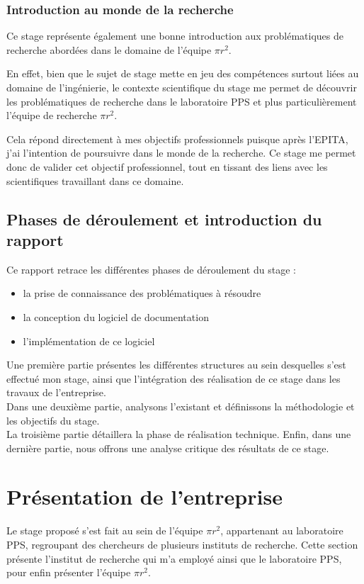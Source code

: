 \documentclass[a4paper, 11pt]{report}
\newcommand{\pir}[0]{\textbf{$\pi r^2$}\xspace}
\newcommand{\epita}[0]{EPITA}
\begin{document}
  \subsection{Introduction au monde de la recherche}
  Ce stage représente également une bonne introduction aux problématiques
  de recherche abordées dans le domaine de l'équipe \pir.

  En effet, bien que le sujet de stage mette en jeu des compétences surtout
  liées au domaine de l'ingénierie, le contexte scientifique du stage me
  permet de découvrir les problématiques de recherche dans le laboratoire PPS
  et plus particulièrement l'équipe de recherche \pir.

  Cela répond directement à mes objectifs professionnels puisque après l'\epita,
  j'ai l'intention de poursuivre dans le monde de la recherche. Ce stage me
  permet donc de valider cet objectif professionnel, tout en tissant des liens
  avec les scientifiques travaillant dans ce domaine.

  \section{Phases de déroulement et introduction du rapport}
  Ce rapport retrace les différentes phases de déroulement du stage :
  \begin{itemize}
    \item la prise de connaissance des problématiques à résoudre
    \item la conception du logiciel de documentation
    \item l'implémentation de ce logiciel
  \end{itemize}

  Une première partie présentes les différentes structures au sein desquelles
  s'est effectué mon stage, ainsi que l'intégration des réalisation de ce stage
  dans les travaux de l'entreprise. \\
  Dans une deuxième partie, analysons l'existant et définissons la méthodologie
  et les objectifs du stage. \\
  La troisième partie détaillera la phase de réalisation technique.
  Enfin, dans une dernière partie, nous offrons une analyse critique des
  résultats de ce stage.

\chapter{Présentation de l'entreprise}
  Le stage proposé s'est fait au sein de l'équipe \pir, appartenant au
  laboratoire PPS, regroupant des chercheurs de plusieurs instituts de
  recherche. Cette section présente l'institut de recherche qui m'a employé
  ainsi que le laboratoire PPS, pour enfin présenter l'équipe \pir.
\end{document}
